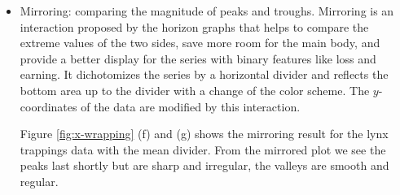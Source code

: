 \documentclass[12pt]{article}
\begin{document}
\begin{itemize}



\item Mirroring: comparing the magnitude of peaks and troughs.
Mirroring is an interaction proposed by the horizon graphs that helps
to compare the extreme values of the two sides, save more room for
the main body, and provide a better display for the series with binary
features like loss and earning. It dichotomizes the series by a horizontal
divider and reflects the bottom area up to the divider with a change
of the color scheme. The $y$-coordinates of the data are modified by
this interaction.

Figure \ref{fig:x-wrapping} (f) and (g) shows the mirroring result
for the lynx trappings data with the mean divider. From the mirrored
plot we see the peaks last shortly but are sharp and irregular, the
valleys are smooth and regular.


\end{itemize}
\end{document}

